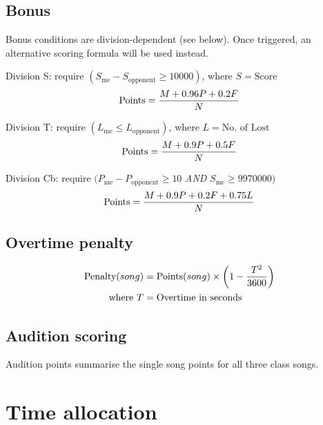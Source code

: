 \documentclass{article}
\newcommand{\alert}[1]{{\color{red} #1}}
\newcommand{\penalyformula}[1]{{\color{cyan} #1}}
\begin{document}
\subsection{Bonus}

Bonus conditions are division-dependent (see below).
Once triggered, an alternative scoring formula
will be used instead.  %

Division S: require $(S_\text{me} - S_\text{opponent} \geq \num[group-separator={,}]{10000})$, where $S = \text{Score}$
\alert{
	\begin{equation*}
		\text{Points} = \frac{M + 0.96P + 0.2F}N
	\end{equation*}
}

Division T: require $(L_\text{me} \leq L_\text{opponent})$, where $L = \text{No.~of Lost}$
\alert{
	\begin{equation*}
		\text{Points} = \frac{M + 0.9P + 0.5F}N
	\end{equation*}
}

Division Cb: require $(P_\text{me} - P_\text{opponent} \geq 10$ \emph{AND} $S_\text{me} \geq \num[group-separator={,}]{9970000})$
\alert{
	\begin{equation*}
		\text{Points}		= \frac{M + 0.9P + 0.2F + 0.75L} N
	\end{equation*}
}

\subsection{Overtime penalty}
\penalyformula{
	\begin{align*}
		\text{Penalty}(song) & = \text{Points}(song) \times \left(1-\frac{{T}^2} {3600}\right) \\
		\text{where}~T       & =\text{Overtime in seconds}
	\end{align*}
}

\subsection{Audition scoring}

Audition points summarise the single song points
for all three class songs.

\section{Time allocation}
\end{document}
